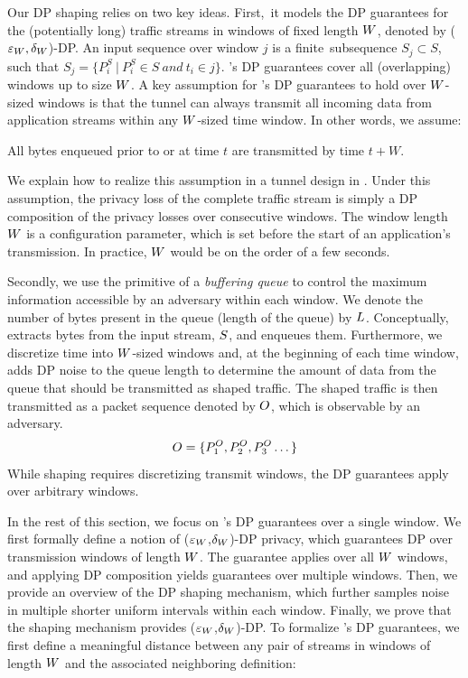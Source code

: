 Our DP shaping relies on two key ideas.
First,~it models the DP guarantees for the (potentially long) traffic streams in windows of fixed length $W$, denoted by \mbox{($\varepsilon_{W}, \delta_{W}$)-DP}.
An input sequence over window $j$ is a finite~sub\-sequence $S_{j} \subset S$, such that $S_{j} = \{ P^S_i~|~P^S_i \in S~and~t_i \in j \}$.
{\sys}'s DP guarantees cover all (overlapping) windows up to size $W$.
A key assumption for {\sys}'s DP guarantees to hold over $W$-sized windows is that the tunnel can always transmit all incoming data from application streams within any $W$-sized time window.
In other words, we assume:
\begin{assumption}\label{assumption:window}
  All bytes enqueued prior to or at time $t$ are transmitted by time
  $t+W$.
\end{assumption}
We explain how to realize this assumption in a tunnel design in .
Under this assumption, the privacy loss of the complete traffic stream is simply a DP composition of the privacy losses over consecutive windows.
The window length $W$ is a configuration parameter, which is set before the start of an application's transmission. In practice, $W$ would be on the order of a few seconds.

Secondly, we use the primitive of a {\em buffering queue} to control the maximum information accessible by an adversary within each window.
We denote the number of bytes present in the queue (\ie length of the queue) by $L$.
Conceptually, {\sys} extracts bytes from the input stream, $S$, and enqueues them.
Furthermore, we discretize time into $W$-sized windows and, at the beginning of each time window, {\sys} adds DP noise to the queue length to determine the amount of data from the queue that should be transmitted as shaped traffic.
The shaped traffic is then transmitted as a packet sequence denoted by $O$, which is observable by an adversary.
\begin{equation}
    O = \{{P^O_1}, {P^O_2}, {P^O_3} \dots \}
\end{equation}
While shaping requires discretizing transmit windows, the DP guarantees apply over arbitrary windows.

In the rest of this section, we focus on {\sys}'s DP guarantees over a single window.
We first formally define a notion of ($\varepsilon_W$,$\delta_W$)-DP privacy, which guarantees DP over transmission windows of length $W$.
The guarantee applies over all $W$ windows, and applying DP composition yields guarantees over multiple windows.
Then, we provide an overview of the DP shaping mechanism, which further samples noise in multiple shorter uniform intervals within each window.
Finally, we prove that the shaping mechanism provides ($\varepsilon_W$,$\delta_W$)-DP.
To formalize {\sys}'s DP guarantees, we first define a meaningful distance between any pair of streams in windows of length $W$ and the associated neighboring definition:

